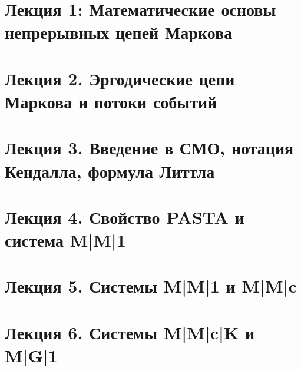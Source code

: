 













\chapter{Лекция 1: Математические основы непрерывных цепей Маркова}


\chapter{Лекция 2. Эргодические цепи Маркова и потоки событий}


\chapter{Лекция 3. Введение в СМО, нотация Кендалла, формула Литтла}


\chapter{Лекция 4. Свойство PASTA и система M|M|1}


\chapter{Лекция 5. Системы M|M|1 и M|M|c}


\chapter{Лекция 6. Системы M|M|c|K и M|G|1}


